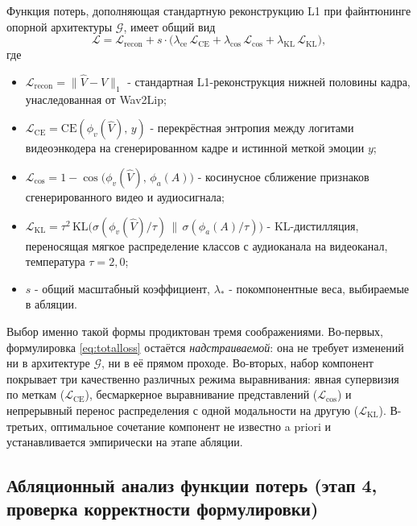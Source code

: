 \documentclass[a4paper, 12pt, oneside, openany]{article}
\begin{document}
Функция потерь, дополняющая стандартную реконструкцию L1 при файнтюнинге опорной архитектуры $\mathcal{G}$, имеет общий вид
\begin{equation}\label{eq:totalloss}
\mathcal{L} = \mathcal{L}_{\text{recon}} + s \cdot \big(\lambda_{\text{ce}}\,\mathcal{L}_{\text{CE}} + \lambda_{\cos}\,\mathcal{L}_{\cos} + \lambda_{\text{KL}}\,\mathcal{L}_{\text{KL}}\big),
\end{equation}
где
\begin{itemize}
\item $\mathcal{L}_{\text{recon}} = \|\hat{V} - V\|_1$ - стандартная L1-реконструкция нижней половины кадра, унаследованная от Wav2Lip;
\item $\mathcal{L}_{\text{CE}} = \mathrm{CE}(\phi_v(\hat{V}),\, y)$ - перекрёстная энтропия между логитами видеоэнкодера на сгенерированном кадре и истинной меткой эмоции $y$;
\item $\mathcal{L}_{\cos} = 1 - \cos\!\bigl(\phi_v(\hat V),\, \phi_a(A)\bigr)$ - косинусное сближение признаков сгенерированного видео и аудиосигнала;
\item $\mathcal{L}_{\text{KL}} = \tau^2\,\mathrm{KL}\!\bigl(\sigma(\phi_v(\hat V)/\tau)\,\|\,\sigma(\phi_a(A)/\tau)\bigr)$ - KL-дистилляция, переносящая мягкое распределение классов с аудиоканала на видеоканал, температура $\tau=2{,}0$;
\item $s$ - общий масштабный коэффициент, $\lambda_{*}$ - покомпонентные веса, выбираемые в абляции.
\end{itemize}

Выбор именно такой формы продиктован тремя соображениями. Во-первых, формулировка \eqref{eq:totalloss} остаётся \textit{надстраиваемой}: она не требует изменений ни в архитектуре $\mathcal{G}$, ни в её прямом проходе. Во-вторых, набор компонент покрывает три качественно различных режима выравнивания: явная супервизия по меткам ($\mathcal{L}_{\text{CE}}$), бесмаркерное выравнивание представлений ($\mathcal{L}_{\cos}$) и непрерывный перенос распределения с одной модальности на другую ($\mathcal{L}_{\text{KL}}$). В-третьих, оптимальное сочетание компонент не известно a priori и устанавливается эмпирически на этапе абляции.

\subsection{Абляционный анализ функции потерь (этап 4, проверка корректности формулировки)}
\end{document}
